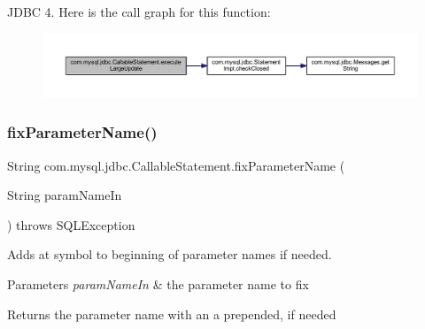 J\+D\+BC 4. Here is the call graph for this function\+:\nopagebreak
\begin{figure}[H]
\begin{center}
\leavevmode
\includegraphics[width=350pt]{classcom_1_1mysql_1_1jdbc_1_1_callable_statement_a6826c04d2f3f824c01d57e21c6f68cca_cgraph}
\end{center}
\end{figure}
\mbox{\label{classcom_1_1mysql_1_1jdbc_1_1_callable_statement_a1986bfd17dcbabcad4efff9b897fab15}} 
\subsubsection{\texorpdfstring{fix\+Parameter\+Name()}{fixParameterName()}}
{\footnotesize\ttfamily String com.\+mysql.\+jdbc.\+Callable\+Statement.\+fix\+Parameter\+Name (\begin{DoxyParamCaption}\item[{String}]{param\+Name\+In }\end{DoxyParamCaption}) throws S\+Q\+L\+Exception\hspace{0.3cm}{\ttfamily [protected]}}

Adds \textquotesingle{}at\textquotesingle{} symbol to beginning of parameter names if needed.


\begin{DoxyParams}{Parameters}
{\em param\+Name\+In} & the parameter name to \textquotesingle{}fix\textquotesingle{}\\
\hline
\end{DoxyParams}
\begin{DoxyReturn}{Returns}
the parameter name with an \textquotesingle{}a\textquotesingle{} prepended, if needed
\end{DoxyReturn}

